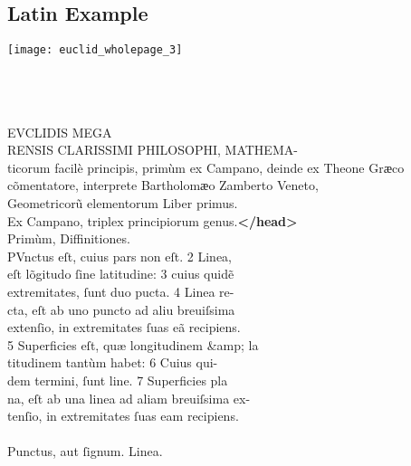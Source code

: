 \subsection{Latin Example}
\label{Structural markup general example}

\texttt{[image: euclid\_wholepage\_3]}
\clearpage

\begin{typeLatin}
 \\
 \\
 \\
EVCLIDIS MEGA \\
RENSIS CLARISSIMI PHILOSOPHI, MATHEMA- \\
ticorum facilè principis, primùm ex Campano, deinde ex Theone Grӕco \\
cõmentatore, interprete Bartholomӕo Zamberto Veneto, \\
Geometricorũ elementorum Liber primus. \\
Ex Campano, triplex principiorum genus.\textbf{</head>} \\
Primùm, Diffinitiones. \\
PVnctus eſt, cuius pars non eſt. 2 Linea, \\
eſt lõgitudo ſine latitudine: 3 cuius quidẽ \\
extremitates, ſunt duo p\bs\tld{}ucta. 4 Linea re- \\
cta, eſt ab uno puncto ad ali\bs\tld{}u breuiſsima \\
extenſio, in extremitates ſuas eã recipiens. \\
5 Superficies eſt, quæ longitudinem &amp; la \\
titudinem tantùm habet: 6 Cuius qui- \\
dem termini, ſunt line. 7 Superficies pla \\
na, eſt ab una linea ad aliam breuiſsima ex- \\
tenſio, in extremitates ſuas eam recipiens.\\
\\
Punctus, aut ſignum. \lwr{}Linea.\\

\end{typeLatin}
